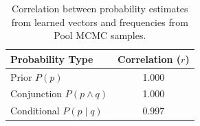 \begin{table}[ht!]
\centering
\small
\begin{tabular}{@{}lc@{}}
\toprule
\textbf{Probability Type} & \textbf{Correlation ($r$)} \\
\midrule
Prior $P(p)$ & 1.000 \\
Conjunction $P(p \land q)$ & 1.000 \\
Conditional $P(p \mid q)$ & 0.997 \\
\bottomrule
\end{tabular}
\vspace{-0.5em}
\caption{\small Correlation between probability estimates from learned vectors and frequencies from Pool MCMC samples.}
\label{tab:correlations}
\end{table}
